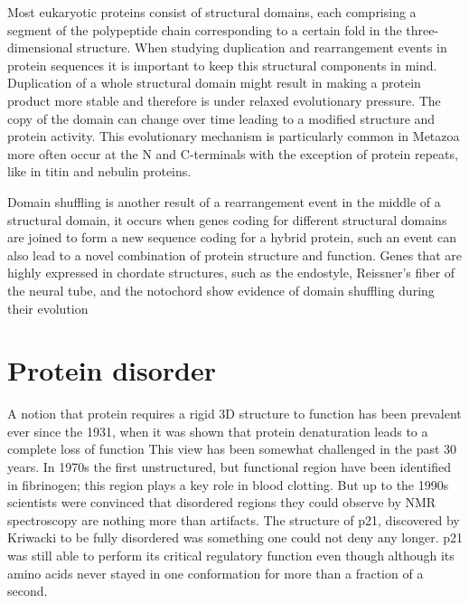 \documentclass[11pt, a4paper,oneside]{report}
\begin{document}
Most eukaryotic proteins consist of structural domains, each comprising a segment of the polypeptide chain corresponding to a certain fold in the three-dimensional structure. When studying duplication and rearrangement events in protein sequences it is important to keep this structural components in mind. Duplication of a whole structural domain might result in making a protein product more stable and therefore is under relaxed evolutionary pressure. The copy of the domain can change over time leading to a modified structure and protein activity. This evolutionary mechanism is particularly common in Metazoa\cite{Bjorklund2006} more often occur at the N and C-terminals\cite{Bjorklund2005} with the exception of protein repeats\cite{Bjorklund2006}, like in titin\cite{Higgins1994} and nebulin\cite{Bjorklund2010} proteins. 

 Domain shuffling is another result of a rearrangement event in the middle of a structural domain, it occurs when genes coding for different structural domains are joined  to form a new sequence coding for a hybrid protein, such an event can also lead to a novel combination of protein structure and function. Genes that are highly expressed in chordate structures, such as the endostyle, Reissner's fiber of the neural tube, and the notochord show evidence of domain shuffling during their evolution\cite{Kawashima2009}
 
\section{Protein disorder}
A notion that protein requires a rigid 3D structure to function has been prevalent ever since the 1931, when it was shown that protein denaturation leads to a complete loss of function\cite{Wu1995} This view has been somewhat challenged in the past 30 years. In 1970s the first unstructured, but functional region have been identified in fibrinogen; this region plays a key role in blood clotting\cite{Doolittle1973}. But up to the 1990s scientists were convinced that disordered regions they could observe by NMR spectroscopy are nothing more than artifacts. The structure of p21, discovered by Kriwacki to be fully disordered was something one could not deny any longer.  p21 was still able to perform its critical regulatory function even though although its amino acids never stayed in one conformation for more than a fraction of a second.
 
\end{document}
